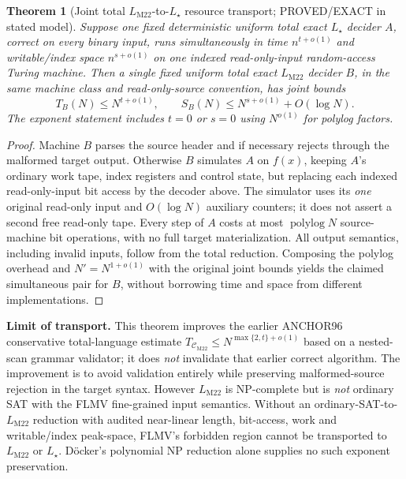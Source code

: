 \documentclass[11pt]{article}
\newtheorem{theorem}{Theorem}
\newcommand{\CM}{\mathcal C_{\mathrm{M22}}}
\newcommand{\LM}{L_{\mathrm{M22}}}
\newcommand{\LS}{L_\star}
\begin{document}
\begin{theorem}[Joint total \(\LM\)-to-\(\LS\) resource transport; PROVED/EXACT in stated model]
Suppose one fixed deterministic uniform \emph{total exact} \(\LS\) decider \(A\), correct on every binary input, runs simultaneously in time \(n^{t+o(1)}\) and writable/index space \(n^{s+o(1)}\) on one indexed read-only-input random-access Turing machine. Then a single fixed uniform total exact \(\LM\) decider \(B\), in the same machine class and read-only-source convention, has joint bounds
\[
\boxed{T_B(N)\le N^{t+o(1)},\qquad S_B(N)\le N^{s+o(1)}+O(\log N).}
\]
The exponent statement includes \(t=0\) or \(s=0\) using \(N^{o(1)}\) for polylog factors.
\end{theorem}
\begin{proof}
Machine \(B\) parses the source header and if necessary rejects through the malformed target output. Otherwise \(B\) simulates \(A\) on \(f(x)\), keeping \(A\)'s ordinary work tape, index registers and control state, but replacing each indexed read-only-input bit access by the decoder above. The simulator uses its \emph{one} original read-only input and \(O(\log N)\) auxiliary counters; it does not assert a second free read-only tape. Every step of \(A\) costs at most \(\operatorname{polylog}N\) source-machine bit operations, with no full target materialization. All output semantics, including invalid inputs, follow from the total reduction. Composing the polylog overhead and \(N'=N^{1+o(1)}\) with the original joint bounds yields the claimed simultaneous pair for \(B\), without borrowing time and space from different implementations.
\end{proof}

\noindent\textbf{Limit of transport.} This theorem improves the earlier ANCHOR96 conservative total-language estimate \(T_{\CM}\le N^{\max\{2,t\}+o(1)}\) based on a nested-scan grammar validator; it does \emph{not} invalidate that earlier correct algorithm. The improvement is to avoid validation entirely while preserving malformed-source rejection in the target syntax. However \(\LM\) is NP-complete but is \emph{not} ordinary SAT with the FLMV fine-grained input semantics. Without an ordinary-SAT-to-\(\LM\) reduction with audited near-linear length, bit-access, work and writable/index peak-space, FLMV's forbidden region cannot be transported to \(\LM\) or \(\LS\). D\"ocker's polynomial NP reduction alone supplies no such exponent preservation.
\end{document}
